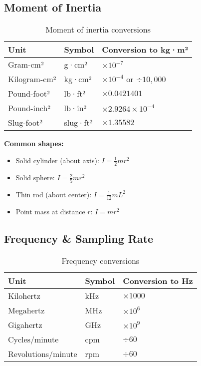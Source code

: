 \subsection{Moment of Inertia}

\begin{table}[H]
\centering
\begin{tabular}{|l|l|l|}
\hline
\rowcolor{blue!20}
\textbf{Unit} & \textbf{Symbol} & \textbf{Conversion to kg·m²} \\
\hline
Gram-cm² & g·cm² & $\times 10^{-7}$ \\
\hline
Kilogram-cm² & kg·cm² & $\times 10^{-4}$ or $\div 10{,}000$ \\
\hline
\rowcolor{yellow!20}
Pound-foot² & lb·ft² & $\times 0.0421401$ \\
\hline
\rowcolor{yellow!20}
Pound-inch² & lb·in² & $\times 2.9264 \times 10^{-4}$ \\
\hline
\rowcolor{yellow!20}
Slug-foot² & slug·ft² & $\times 1.35582$ \\
\hline
\end{tabular}
\caption{Moment of inertia conversions}
\end{table}

\textbf{Common shapes:}
\begin{itemize}
    \item Solid cylinder (about axis): $I = \frac{1}{2}mr^2$
    \item Solid sphere: $I = \frac{2}{5}mr^2$
    \item Thin rod (about center): $I = \frac{1}{12}mL^2$
    \item Point mass at distance $r$: $I = mr^2$
\end{itemize}

\subsection{Frequency \& Sampling Rate}

\begin{table}[H]
\centering
\begin{tabular}{|l|l|l|}
\hline
\rowcolor{blue!20}
\textbf{Unit} & \textbf{Symbol} & \textbf{Conversion to Hz} \\
\hline
Kilohertz & kHz & $\times 1000$ \\
\hline
Megahertz & MHz & $\times 10^{6}$ \\
\hline
Gigahertz & GHz & $\times 10^{9}$ \\
\hline
Cycles/minute & cpm & $\div 60$ \\
\hline
Revolutions/minute & rpm & $\div 60$ \\
\hline
\end{tabular}
\caption{Frequency conversions}
\end{table}

